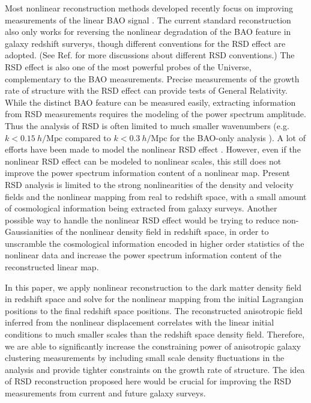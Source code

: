 \documentclass[aps,prx,twocolumn,superscriptaddress,groupedaddress,nofootinbib,amsfont]{revtex4}  %
\newcommand{\mr}{\mathrm}
\begin{document}
Most nonlinear reconstruction methods developed recently focus on improving 
measurements of the linear BAO signal \cite{2016HMZ,2017Marcel,2017Shi,2017US}.
The current standard reconstruction also only works for reversing the nonlinear
degradation of the BAO feature in galaxy redshift surverys, though different
conventions for the RSD effect are adopted. (See Ref. \cite{2016Seo} for more
discussions about different RSD conventions.) 
The RSD effect is also one of the most powerful probes of the Universe, 
complementary to the BAO measurements. Precise measurements of the growth rate
of structure with the RSD effect can provide tests of General Relativity. 
While the distinct BAO feature can be measured easily, extracting information
from RSD measurements requires the modeling of the power spectrum amplitude.
Thus the analysis of RSD is often limited to much smaller wavenumbers
(e.g. $k<0.15\ h/\mr{Mpc}$ compared to $k<0.3\ h/\mr{Mpc}$ for the BAO-only
analysis \cite{2017F,2017F2}).
A lot of efforts have been made to model the nonlinear RSD effect \cite{1995F,1998H,2001W,2001S,2002K,2004S,2006T,2007T,2010D,2010TNS,2011M,2011O,2011O2,2011S,2011J,2011GSM,2011DF,2012O,2012O2,2012K,2013Z,2013Z2,2014I,2015W,2015B,2016B,2016J,2017H}.
However, even if the nonlinear RSD effect can be modeled to nonlinear scales,
this still does not improve the power spectrum information content of a 
nonlinear map.
Present RSD analysis is limited to the strong nonlinearities of the density 
and velocity fields and the nonlinear mapping from real to redshift space, with
a small amount of cosmological information being extracted from galaxy surveys.
Another possible way to handle the nonlinear RSD effect would be trying to 
reduce non-Gaussianities of the nonlinear density field in redshift space,
in order to unscramble the cosmological information encoded in higher order 
statistics of the nonlinear data and increase the power spectrum information 
content of the reconstructed linear map.

In this paper, we apply nonlinear reconstruction to the dark matter density 
field in redshift space and solve for the nonlinear mapping from the initial 
Lagrangian positions to the final redshift space positions.
The reconstructed anisotropic field inferred from the nonlinear 
displacement correlates with the linear initial conditions to much smaller
scales than the redshift space density field.
Therefore, we are able to significantly increase the constraining power of 
anisotropic galaxy clustering measurements by including small scale density
fluctuations in the analysis and provide tighter constraints
on the growth rate of structure.
The idea of RSD reconstruction proposed here would be crucial for improving
the RSD measurements from current and future galaxy surveys.
\end{document}
